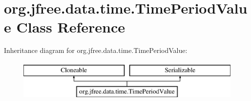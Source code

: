 \hypertarget{classorg_1_1jfree_1_1data_1_1time_1_1_time_period_value}{}\section{org.\+jfree.\+data.\+time.\+Time\+Period\+Value Class Reference}
\label{classorg_1_1jfree_1_1data_1_1time_1_1_time_period_value}
Inheritance diagram for org.\+jfree.\+data.\+time.\+Time\+Period\+Value\+:\begin{figure}[H]
\begin{center}
\leavevmode
\includegraphics[height=2.000000cm]{classorg_1_1jfree_1_1data_1_1time_1_1_time_period_value}
\end{center}
\end{figure}
